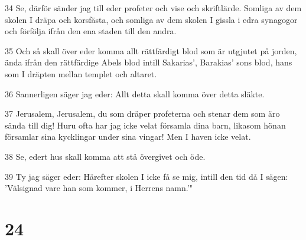 \par 34 Se, därför sänder jag till eder profeter och vise och skriftlärde. Somliga av dem skolen I dräpa och korsfästa, och somliga av dem skolen I gissla i edra synagogor och förfölja ifrån den ena staden till den andra.
\par 35 Och så skall över eder komma allt rättfärdigt blod som är utgjutet på jorden, ända ifrån den rättfärdige Abels blod intill Sakarias', Barakias' sons blod, hans som I dräpten mellan templet och altaret.
\par 36 Sannerligen säger jag eder: Allt detta skall komma över detta släkte.
\par 37 Jerusalem, Jerusalem, du som dräper profeterna och stenar dem som äro sända till dig! Huru ofta har jag icke velat församla dina barn, likasom hönan församlar sina kycklingar under sina vingar! Men I haven icke velat.
\par 38 Se, edert hus skall komma att stå övergivet och öde.
\par 39 Ty jag säger eder: Härefter skolen I icke få se mig, intill den tid då I sägen: 'Välsignad vare han som kommer, i Herrens namn.'"

\chapter{24}


